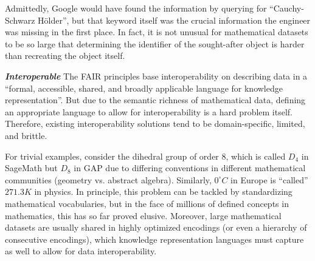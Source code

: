 Admittedly, Google would have found the information by querying for ``Cauchy-Schwarz H\"older'', but that keyword itself was the crucial information the engineer was missing in the first place. 
In fact, it is not unusual for mathematical datasets to be so large that determining the identifier of the sought-after object is harder than recreating the object itself.

\medskip

\textbf{\emph{Interoperable}}
The FAIR principles base interoperability on describing data in a ``formal, accessible, shared, and broadly applicable language for knowledge representation''.
But due to the semantic richness of mathematical data, defining an appropriate language to allow for interoperability is a hard problem itself.
Therefore, existing interoperability solutions tend to be domain-specific, limited, and brittle.

For trivial examples, consider the dihedral group of order 8, which is called $D_4$ in SageMath but $D_8$ in GAP due to differing conventions in different mathematical communities (geometry vs. abstract algebra).
Similarly, $0^\circ C$ in Europe is ``called'' $271.3 K$ in physics.
In principle, this problem can be tackled by standardizing mathematical vocabularies, but in the face of millions of defined concepts in mathematics, this has so far proved elusive.
Moreover, large mathematical datasets are usually shared in highly optimized encodings (or even a hierarchy of consecutive encodings), which knowledge representation languages must capture as well to allow for data interoperability.



